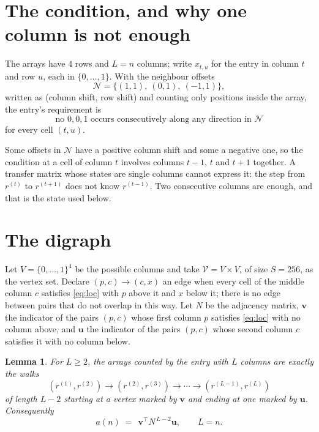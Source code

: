\documentclass[11pt,a4paper]{article}
\theoremstyle{plain}
\newtheorem{lemma}[theorem]{Lemma}
\theoremstyle{definition}
\begin{document}
\section{The condition, and why one column is not enough}

The arrays have $4$ rows and $L=n$ columns; write $x_{t,u}$ for the entry in
column $t$ and row $u$, each in $\{0,\dots,1\}$. With the neighbour offsets
\[
\mathcal N=\{(1,1),\ (0,1),\ (-1,1)\},
\]
written as (column shift, row shift) and counting only positions inside the array, the
entry's requirement is
\begin{equation}\label{eq:loc}
\text{no }0,0,1\text{ occurs consecutively along any direction in }\mathcal N
\end{equation}
for every cell $(t,u)$.

Some offsets in $\mathcal N$ have a positive column shift and some a negative one, so the
condition at a cell of column $t$ involves columns $t-1$, $t$ and $t+1$ together. A transfer
matrix whose states are single columns cannot express it: the step from $r^{(t)}$ to
$r^{(t+1)}$ does not know $r^{(t-1)}$. Two consecutive columns are enough, and that is
the state used below.

\section{The digraph}

Let $V=\{0,\dots,1\}^{4}$ be the possible columns and take
$\mathcal V=V\times V$, of size $S=256$, as the vertex set. Declare $(p,c)\to(c,x)$ an edge
when every cell of the middle column $c$ satisfies \eqref{eq:loc} with $p$ above it and $x$
below it; there is no edge between pairs that do not overlap in this way. Let $N$ be the
adjacency matrix, $\mathbf{v}$ the indicator of the pairs $(p,c)$ whose first column $p$
satisfies \eqref{eq:loc} with no column above, and $\mathbf{u}$ the indicator of
the pairs $(p,c)$ whose second column $c$ satisfies it with no column below.

\begin{lemma}\label{lem:walk}
For $L\ge2$, the arrays counted by the entry with $L$ columns are exactly the walks
\[
(r^{(1)},r^{(2)})\to(r^{(2)},r^{(3)})\to\cdots\to(r^{(L-1)},r^{(L)})
\]
of length $L-2$ starting at a vertex marked by $\mathbf{v}$ and ending at one marked by
$\mathbf{u}$. Consequently
\[
a(n)\;=\;\,\mathbf{v}^{\!\top}N^{\,L-2}\mathbf{u},\qquad L=n .
\]
\end{lemma}
\end{document}
